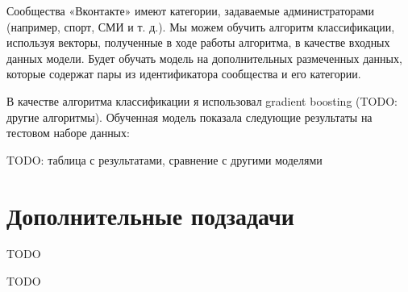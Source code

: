 \documentclass[times,specification,annotation]{itmo-student-thesis}
\begin{document}
Сообщества «Вконтакте» имеют категории, задаваемые администраторами
(например, спорт, СМИ и т. д.). Мы можем обучить алгоритм классификации,
используя векторы, полученные в ходе работы алгоритма, в качестве входных
данных модели. Будет обучать модель на дополнительных размеченных данных,
которые содержат пары из идентификатора сообщества и его категории.

В качестве алгоритма классификации я использовал gradient boosting (TODO:
другие алгоритмы). Обученная модель показала следующие
результаты на тестовом наборе данных:

TODO: таблица с результатами, сравнение с другими моделями

\section{Дополнительные подзадачи}

TODO

\startconclusionpage

TODO

\printmainbibliography

\appendix
\end{document}

